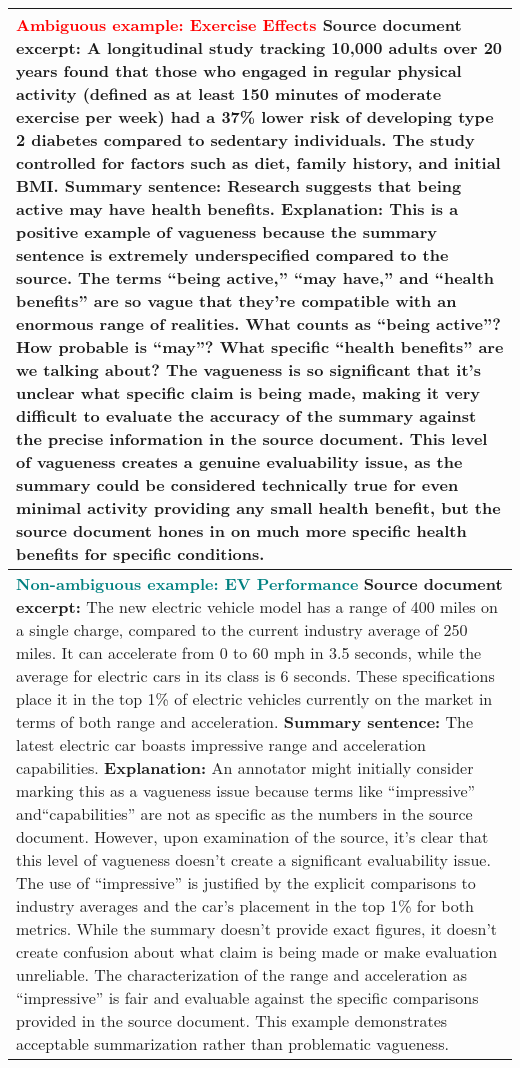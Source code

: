 \begin{table*}
\centering
\small
\begin{tabular}{@{}p{14cm}@{}}
\toprule
\textbf{\textcolor{red}{Ambiguous example: Exercise Effects}}
\newline
\textbf{Source document excerpt:}
A longitudinal study tracking 10,000 adults over 20 years found that those who engaged in regular physical activity (defined as at least 150 minutes of moderate exercise per week) had a 37\% lower risk of developing type 2 diabetes compared to sedentary individuals. The study controlled for factors such as diet, family history, and initial BMI.
\newline
\textbf{Summary sentence:}
Research suggests that being active may have health benefits.
\newline
\textbf{Explanation:}
This is a positive example of vagueness because the summary sentence is extremely underspecified compared to the source. The terms “being active,” “may have,” and “health benefits” are so vague that they’re compatible with an enormous range of realities. What counts as “being active”? How probable is “may”? What specific “health benefits” are we talking about? The vagueness is so significant that it’s unclear what specific claim is being made, making it very difficult to evaluate the accuracy of the summary against the precise information in the source document. This level of vagueness creates a genuine evaluability issue, as the summary could be considered technically true for even minimal activity providing any small health benefit, but the source document hones in on much more specific health benefits for specific conditions.
\\
\midrule
\textbf{\textcolor{teal}{Non-ambiguous example: EV Performance}}
\newline
\textbf{Source document excerpt:}
The new electric vehicle model has a range of 400 miles on a single charge, compared to the current industry average of 250 miles. It can accelerate from 0 to 60 mph in 3.5 seconds, while the average for electric cars in its class is 6 seconds. These specifications place it in the top 1\% of electric vehicles currently on the market in terms of both range and acceleration.
\newline
\textbf{Summary sentence:}
The latest electric car boasts impressive range and acceleration capabilities.
\newline
\textbf{Explanation:}
An annotator might initially consider marking this as a vagueness issue because terms like “impressive” and“capabilities” are not as specific as the numbers in the source document. However, upon examination of the source, it’s clear that this level of vagueness doesn’t create a significant evaluability issue. The use of “impressive” is justified by the explicit comparisons to industry averages and the car’s placement in the top 1\% for both metrics. While the summary doesn’t provide exact figures, it doesn’t create confusion about what claim is being made or make evaluation unreliable. The characterization of the range and acceleration as “impressive” is fair and evaluable against the specific comparisons provided in the source document. This example demonstrates acceptable summarization rather than problematic vagueness.

\end{tabular}
\end{table*}
